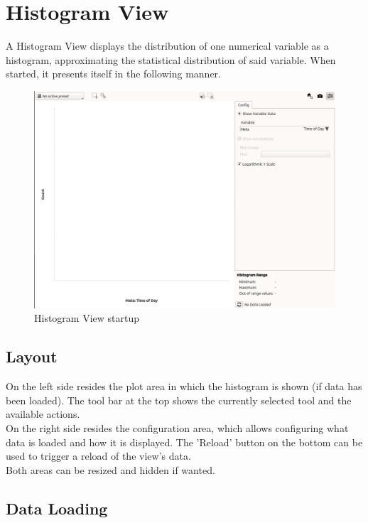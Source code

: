 \chapter{Histogram View}
\label{sec:histo_view}

A Histogram View displays the distribution of one numerical variable as a histogram, approximating the statistical distribution of said variable. When started, it presents itself in the following manner.

\begin{figure}[H]
    \hspace*{-2cm}
    \includegraphics[width=18cm,frame]{figures/histogram_start.png}
  \caption{Histogram View startup}
\end{figure}

\section{Layout}

On the left side resides the plot area in which the histogram is shown (if data has been loaded). 
The tool bar at the top shows the currently selected tool and the available actions.\\

On the right side resides the configuration area, which allows configuring what data is loaded and how it is displayed.
The 'Reload' button on the bottom can be used to trigger a reload of the view's data.\\

Both areas can be resized and hidden if wanted.

\section{Data Loading}


